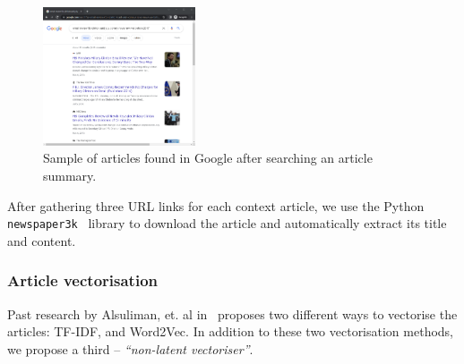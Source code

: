 \documentclass{article}
\begin{document}
\begin{figure}[H]
  \centering
  \includegraphics[width=0.4\textwidth]{img/chrome-article-scraping.png}
  \caption{Sample of articles found in Google after searching an article summary.}
\end{figure}

\noindent
After gathering three URL links for each context article, we use the Python \verb|newspaper3k|~\cite{py-newspaper} library to download the article and automatically extract its title and content.


\subsubsection{Article vectorisation} \label{section:article-vectorisation}
Past research by Alsuliman, et. al in~\cite{alsuliman2022social} proposes two different ways to vectorise the articles: TF-IDF, and Word2Vec. In addition to these two vectorisation methods, we propose a third -- \emph{``non-latent vectoriser''}.
\end{document}
